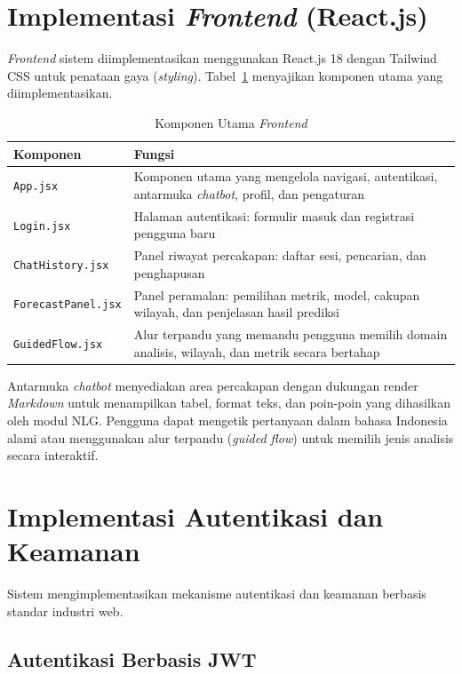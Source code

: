 \section{Implementasi \textit{Frontend} (React.js)}
\label{sec:impl-frontend}

\textit{Frontend} sistem diimplementasikan menggunakan React.js 18 dengan Tailwind CSS untuk penataan gaya (\textit{styling}). Tabel~\ref{tab:komponen-frontend} menyajikan komponen utama yang diimplementasikan.

\begin{table}[htbp]
\centering
\caption{Komponen Utama \textit{Frontend}}
\label{tab:komponen-frontend}
\begin{tabular}{|p{3.5cm}|p{9cm}|}
\hline
\textbf{Komponen} & \textbf{Fungsi} \\
\hline
\texttt{App.jsx} & Komponen utama yang mengelola navigasi, autentikasi, antarmuka \textit{chatbot}, profil, dan pengaturan \\
\hline
\texttt{Login.jsx} & Halaman autentikasi: formulir masuk dan registrasi pengguna baru \\
\hline
\texttt{ChatHistory.jsx} & Panel riwayat percakapan: daftar sesi, pencarian, dan penghapusan \\
\hline
\texttt{ForecastPanel.jsx} & Panel peramalan: pemilihan metrik, model, cakupan wilayah, dan penjelasan hasil prediksi \\
\hline
\texttt{GuidedFlow.jsx} & Alur terpandu yang memandu pengguna memilih domain analisis, wilayah, dan metrik secara bertahap \\
\hline
\end{tabular}
\end{table}

Antarmuka \textit{chatbot} menyediakan area percakapan dengan dukungan render \textit{Markdown} untuk menampilkan tabel, format teks, dan poin-poin yang dihasilkan oleh modul NLG. Pengguna dapat mengetik pertanyaan dalam bahasa Indonesia alami atau menggunakan alur terpandu (\textit{guided flow}) untuk memilih jenis analisis secara interaktif.

\section{Implementasi Autentikasi dan Keamanan}
\label{sec:impl-auth}

Sistem mengimplementasikan mekanisme autentikasi dan keamanan berbasis standar industri web.

\subsection{Autentikasi Berbasis JWT}

